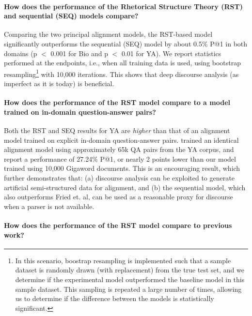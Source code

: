 \paragraph{How does the performance of the Rhetorical Structure Theory (RST) and sequential (SEQ) models compare?}

Comparing the two principal alignment models, the RST-based model significantly outperforms the sequential (SEQ) model by about 0.5\% P@1 in both domains (p $<$ 0.001 for Bio and p $<$ 0.01 for YA).  We report statistics performed at the endpoints, i.e., when all training data is used, using bootstrap resampling\footnote{In this scenario, boostrap resampling is implemented such that a sample dataset is randomly drawn (with replacement) from the true test set, and we determine if the experimental model outperformed the baseline model in this sample dataset.  This sampling is repeated a large number of times, allowing us to determine if the difference between the models is statistically significant.} with 10,000 iterations. This shows that deep discourse analysis (as imperfect as it is today) is beneficial. 

\paragraph{How does the performance of the RST model compare to a model trained on in-domain question-answer pairs?}

Both the RST and SEQ results for YA are {\em higher} than that of an alignment model trained on explicit in-domain question-answer pairs. \citet{fried2015higher} trained an identical alignment model using approximately 65k QA pairs from the YA corpus, and report a performance of 27.24\% P@1, or nearly 2 points lower than our model trained using 10,000 Gigaword documents. This is an encouraging result, which further demonstrates that: (a) discourse analysis can be exploited to generate artificial semi-structured data for alignment, and (b) the sequential model, which also outperforms Fried et. al, can be used as a reasonable proxy for discourse when a parser is not available. 

\paragraph{How does the performance of the RST model compare to previous work?}

